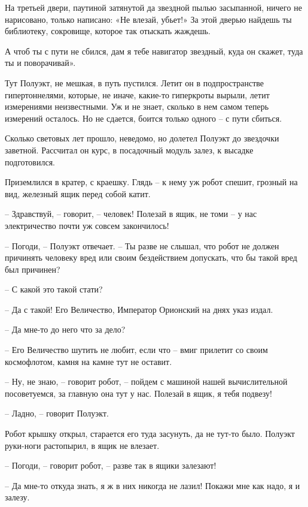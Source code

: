 \documentclass[ebook,oneside,final,openright]{memoir}
\begin{document}
\par
На третьей двери, паутиной затянутой да звездной пылью засыпанной, ничего не нарисовано, только написано: «Не влезай, убьет!» За этой дверью найдешь ты библиотеку, сокровище, которое так отыскать жаждешь.\par
\par
А чтоб ты с пути не сбился, дам я тебе навигатор звездный, куда он скажет, туда ты и поворачивай».\par
\par
Тут Полуэкт, не мешкая, в путь пустился. Летит он в подпространстве гипертоннелями, которые, не иначе, какие-то гиперкроты вырыли, летит измерениями неизвестными. Уж и не знает, сколько в нем самом теперь измерений осталось. Но не сдается, боится только одного – с пути сбиться.\par
\par
Сколько световых лет прошло, неведомо, но долетел Полуэкт до звездочки заветной. Рассчитал он курс, в посадочный модуль залез, к высадке подготовился.\par
\par
Приземлился в кратер, с краешку. Глядь – к нему уж робот спешит, грозный на вид, железный ящик перед собой катит.\par
– Здравствуй, – говорит, – человек! Полезай в ящик, не томи – у нас электричество почти уж совсем закончилось!\par
– Погоди, – Полуэкт отвечает. – Ты разве не слышал, что робот не должен причинять человеку вред или своим бездействием допускать, что бы такой вред был причинен?\par
– С какой это такой стати?\par
– Да с такой! Его Величество, Император Орионский на днях указ издал.\par
– Да мне-то до него что за дело?\par
– Его Величество шутить не любит, если что – вмиг прилетит со своим космофлотом, камня на камне тут не оставит.\par
– Ну, не знаю, – говорит робот, – пойдем с машиной нашей вычислительной посоветуемся, за главную она тут у нас. Полезай в ящик, я тебя подвезу!\par
– Ладно, – говорит Полуэкт.\par
Робот крышку открыл, старается его туда засунуть, да не тут-то было. Полуэкт руки-ноги растопырил, в ящик не влезает. \par
– Погоди, – говорит робот, – разве так в ящики залезают! \par
– Да мне-то откуда знать, я ж в них никогда не лазил! Покажи мне как надо, я и залезу. \par
\end{document}
